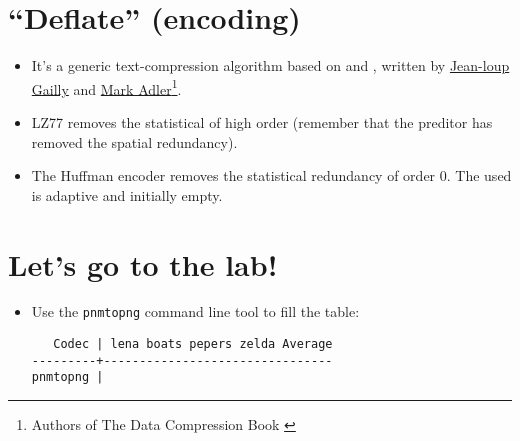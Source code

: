 \section{``Deflate'' (encoding)}
\begin{itemize}
\item It's a generic text-compression algorithm based on
   and ,
  written by
  \href{https://en.wikipedia.org/wiki/Jean-loup_Gailly}{Jean-loup
    Gailly} and \href{https://en.wikipedia.org/wiki/Mark_Adler}{Mark
    Adler}\footnote{Authors of The Data Compression Book
    \cite{Nelson96}}.
\item LZ77 removes the statistical  of high order
  (remember that the preditor has removed the spatial redundancy).
\item The Huffman encoder removes the statistical redundancy of order
  0. The  used is
  adaptive and initially empty.
\end{itemize}


\section*{Let's go to the lab!}
\begin{itemize}
\item Use the \texttt{pnmtopng} command line tool to fill the table:
\begin{verbatim}
   Codec | lena boats pepers zelda Average
---------+--------------------------------
pnmtopng | 
\end{verbatim}
\end{itemize}


